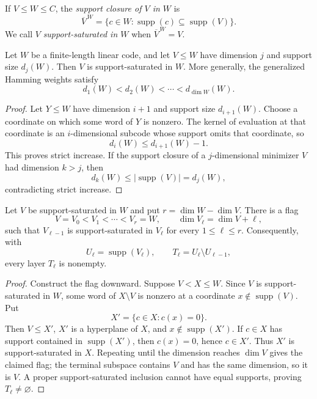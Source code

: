 \documentclass[11pt,a4paper]{amsart}
\numberwithin{equation}{section}
\theoremstyle{remark}
\DeclareMathOperator{\supp}{supp}\DeclareMathOperator{\Fib}{Fib}\DeclareMathOperator{\Sym}{Sym}
\begin{document}
\begin{definition}
\label{def:support-saturation}
If $V\le W\le C$, the \emph{support closure of $V$ in $W$} is
\[
 \overline V^{\,W}
 =\{c\in W:\supp(c)\subseteq\supp(V)\}.
\]
We call $V$ \emph{support-saturated in $W$} when
$\overline V^{\,W}=V$.
\end{definition}

\begin{lemma}
\label{lem:weight-minimizer-saturated}
Let $W$ be a finite-length linear code, and let $V\le W$ have dimension
$j$ and support size $d_j(W)$.  Then $V$ is support-saturated in $W$.
More generally, the generalized Hamming weights satisfy
\[
 d_1(W)<d_2(W)<\cdots<d_{\dim W}(W).
\]
\end{lemma}

\begin{proof}
Let $Y\le W$ have dimension $i+1$ and support size $d_{i+1}(W)$.
Choose a coordinate on which some word of $Y$ is nonzero.  The kernel of
evaluation at that coordinate is an $i$-dimensional subcode whose support
omits that coordinate, so
\[
 d_i(W)\le d_{i+1}(W)-1.
\]
This proves strict increase.  If the support closure of a
$j$-dimensional minimizer $V$ had dimension $k>j$, then
\[
 d_k(W)\le|\supp(V)|=d_j(W),
\]
contradicting strict increase.
\end{proof}

\begin{lemma}
\label{lem:support-saturated-flag}
Let $V$ be support-saturated in $W$ and put
$r=\dim W-\dim V$.  There is a flag
\[
 V=V_0<V_1<\cdots<V_r=W,
 \qquad \dim V_\ell=\dim V+\ell,
\]
such that $V_{\ell-1}$ is support-saturated in $V_\ell$ for every
$1\le\ell\le r$.  Consequently, with
\[
 U_\ell=\supp(V_\ell),\qquad
 T_\ell=U_\ell\setminus U_{\ell-1},
\]
every layer $T_\ell$ is nonempty.
\end{lemma}

\begin{proof}
Construct the flag downward.  Suppose $V<X\le W$.  Since $V$ is
support-saturated in $W$, some word of $X\setminus V$ is nonzero at a
coordinate $x\notin\supp(V)$.  Put
\[
 X'=\{c\in X:c(x)=0\}.
\]
Then $V\le X'$, $X'$ is a hyperplane of $X$, and $x\notin\supp(X')$.
If $c\in X$ has support contained in $\supp(X')$, then $c(x)=0$, hence
$c\in X'$.  Thus $X'$ is support-saturated in $X$.  Repeating until the
dimension reaches $\dim V$ gives the claimed flag; the terminal subspace
contains $V$ and has the same dimension, so it is $V$.  A proper
support-saturated inclusion cannot have equal supports, proving
$T_\ell\ne\varnothing$.
\end{proof}
\end{document}
